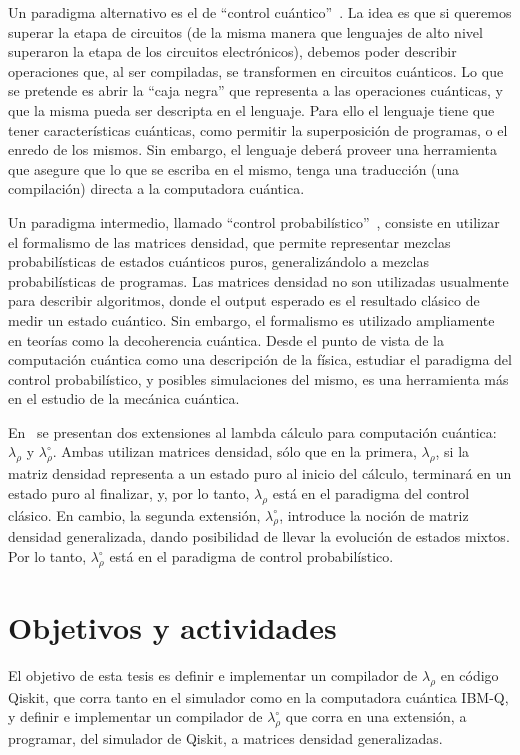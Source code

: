 \documentclass[a4paper]{article}
\begin{document}
Un paradigma alternativo es el de ``control
cuántico''~\cite{AltenkirchGrattageLICS05,ArrighiDowekLMCS17,DiazcaroGuillermoMiquelValironLICS19}.
La idea es que si queremos superar la etapa de circuitos (de la misma manera que
lenguajes de alto nivel superaron la etapa de los circuitos electrónicos),
debemos poder describir operaciones que, al ser compiladas, se transformen en
circuitos cuánticos. Lo que se pretende es abrir la ``caja negra'' que
representa a las operaciones cuánticas, y que la misma pueda ser descripta en el
lenguaje. Para ello el lenguaje tiene que tener características cuánticas, como
permitir la superposición de programas, o el enredo de los mismos. Sin embargo,
el lenguaje deberá proveer una herramienta que asegure que lo que se escriba en
el mismo, tenga una traducción (una compilación) directa a la computadora
cuántica.

Un paradigma intermedio, llamado ``control
probabilístico''~\cite{DiazcaroAPLAS17}, consiste en utilizar el formalismo de
las matrices densidad, que permite representar mezclas probabilísticas de
estados cuánticos puros, generalizándolo a mezclas probabilísticas de programas.
Las matrices densidad no son utilizadas usualmente para describir algoritmos,
donde el output esperado es el resultado clásico de medir un estado cuántico.
Sin embargo, el formalismo es utilizado ampliamente en teorías como la
decoherencia cuántica. Desde el punto de vista de la computación cuántica como
una descripción de la física, estudiar el paradigma del control probabilístico,
y posibles simulaciones del mismo, es una herramienta más en el estudio de la
mecánica cuántica.

En~\cite{DiazcaroAPLAS17} se presentan dos extensiones al lambda cálculo para
computación cuántica: $\lambda_\rho$ y $\lambda_\rho^\circ$. Ambas utilizan
matrices densidad, sólo que en la primera, $\lambda_\rho$, si la matriz densidad representa a un
estado puro al inicio del cálculo, terminará en un estado puro al finalizar, y,
por lo tanto, $\lambda_\rho$ está en el paradigma del control clásico. En
cambio, la segunda extensión, $\lambda_\rho^\circ$, introduce la noción de
matriz densidad generalizada, dando posibilidad de llevar la evolución de
estados mixtos. Por lo tanto, $\lambda_\rho^\circ$ está en el paradigma de
control probabilístico.


\section*{Objetivos y actividades}
El objetivo de esta tesis es definir e implementar un compilador de
$\lambda_\rho$ en código Qiskit, que corra tanto en el simulador como en la
computadora cuántica IBM-Q, y definir e implementar un compilador de
$\lambda_\rho^\circ$ que corra en una extensión, a programar, del simulador de
Qiskit, a matrices densidad generalizadas.
\end{document}
